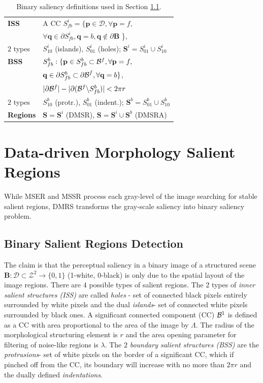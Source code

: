 \documentclass{article}
\def\B{{\mathbf B}}
\def\mcD{{\mathcal{D}}}
\def\p{{\mathbf p}}
\def\q{{\mathbf q}}
\def\S{{\mathbf S}}
\begin{document}
\begin{table}[hbt]
\begin{minipage}[b]{0.98\linewidth}\begin{tabular}{|l l|}
\hline

{\bf ISS} & A CC $S^i_{fb} = \{\p \in \mcD, \forall \p=f,$\\&$\forall \q \in \partial S^i_{fb}, \q=b, \q \notin \partial \B $ \},\\
$2$ types & $S^i_{10}$ (islands), $S^i_{01}$  (holes); $\S^i = S_{01}^i \cup S_{10}^i$\\
{\bf BSS} &  $S_{fb}^b: \{\p \in S_{fb}^b \subset{\cal B}^f, \forall \p = f,$\\&$ \q \in \partial S_{fb}^b \subset {\partial \cal B}^f,\forall \q = b \}$, \\
& $|\partial {\cal B}^f| - |\partial ({\cal B}^f \backslash S_{fb}^b)| < 2 \pi r$\\
$2$ types & $S^b_{10}$ (protr.), $S^b_{01}$ (indent.); $\S^b = S_{01}^b \cup S_{10}^b$\\
{\bf Regions} &  $\S = \S^i$ (DMSR), $\S = \S^i \cup \S^b$ (DMSRA)  \\

\hline
\end{tabular}
\caption{Binary saliency definitions used in Section \ref{ssec:binary}.}\label{table:binary_sal}
\end{minipage}
\vspace*{-1cm}
\end{table}

\section{Data-driven Morphology Salient Regions}
\label{sec:DMSR}
While MSER and MSSR process each gray-level of the image searching for stable salient regions, DMRS transforms the gray-scale saliency into binary saliency problem.
\subsection{Binary Salient Regions Detection}
\label{ssec:binary}
The claim is that the perceptual saliency in a binary image of a structured scene 
 $\B: \mcD \subset \mathcal{Z}^2 \rightarrow \{0,1\}$ (1-white, 0-black)
is only due to the spatial layout of the image regions. 
There are  $4$ possible types of salient regions. The $2$ types of {\em inner salient structures (ISS)} are called {\em holes} - set of connected black pixels entirely surrounded by white pixels and the dual {\em islands}- set of connected white pixels surrounded by black ones. A significant connected component (CC) ${\cal B}^1$ is defined as a CC with area proportional to the area
of the image by  $\Lambda$. The radius of the morphological structuring element is $r$ and  the area opening parameter for filtering of noise-like regions is $\lambda$. The $2$ {\em boundary salient structures (BSS)} are the {\em protrusions}- set of white pixels on the border of a significant CC, which if pinched off from the CC, its boundary will increase with no more than $2\pi r$ and the dually defined {\em indentations}. 
\end{document}
